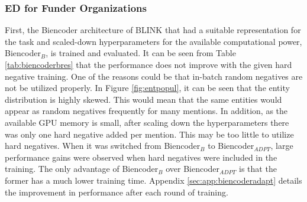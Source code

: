 \documentclass{report}
\theoremstyle{definition}
\theoremstyle{remark}
\begin{document}
\subsubsection{ED for Funder Organizations}

First, the Biencoder architecture of BLINK that had a suitable representation for the task and scaled-down hyperparameters for the available computational power, Biencoder$_B$, is trained and evaluated. It can be seen from Table \ref{tab:biencoderbres} that the performance does not improve with the given hard negative training. One of the reasons could be that in-batch random negatives are not be utilized properly. In Figure \ref{fig:entpopul}, it can be seen that the entity distribution is highly skewed. This would mean that the same entities would appear as random negatives frequently for many mentions. In addition, as the available GPU memory is small, after scaling down the hyperparameters there was only one hard negative added per mention. This may be too little to utilize hard negatives. When it was switched from Biencoder$_B$ to Biencoder$_{ADPT}$, large performance gains were observed when hard negatives were included in the training. The only advantage of Biencoder$_B$ over Biencoder$_{ADPT}$ is that the former has a much lower training time. Appendix \ref{sec:app:biencoderadapt} details the improvement in performance after each round of training.
\end{document}
